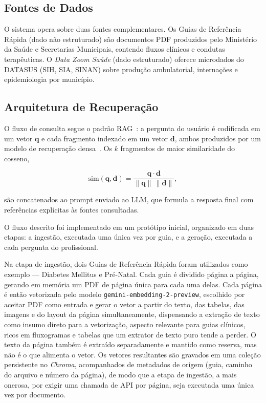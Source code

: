 \documentclass[conference,a4paper]{IEEEtran}
\begin{document}
\subsection{Fontes de Dados}

O sistema opera sobre duas fontes complementares. Os Guias
de Referência Rápida (dado não estruturado) são documentos PDF
produzidos pelo Ministério da Saúde e Secretarias Municipais,
contendo fluxos clínicos e condutas terapêuticas. O \textit{Data
Zoom Saúde} (dado estruturado) oferece microdados do DATASUS
(SIH, SIA, SINAN) sobre produção ambulatorial, internações e
epidemiologia por município.

\subsection{Arquitetura de Recuperação}

O fluxo de consulta segue o padrão RAG~\cite{lewis2020rag}: a
pergunta do usuário é codificada em um vetor $\mathbf{q}$ e cada
fragmento indexado em um vetor $\mathbf{d}$, ambos produzidos por
um modelo de recuperação densa~\cite{karpukhin2020dpr}. Os $k$
fragmentos de maior similaridade do cosseno,

\begin{equation}
  \text{sim}(\mathbf{q}, \mathbf{d}) =
    \frac{\mathbf{q} \cdot \mathbf{d}}{\|\mathbf{q}\|\,\|\mathbf{d}\|},
  \label{eq:cosine}
\end{equation}

são concatenados ao prompt enviado ao LLM, que formula a resposta
final com referências explícitas às fontes consultadas.

O fluxo descrito foi implementado em um protótipo inicial, organizado em duas etapas: a ingestão, executada uma única vez por guia, e a geração, executada a cada pergunta do profissional.

Na etapa de ingestão, dois Guias de Referência Rápida foram utilizados como exemplo --- Diabetes Mellitus e Pré-Natal. Cada guia é dividido página a página, gerando em memória um PDF de página única para cada uma delas. Cada página é então vetorizada pelo modelo \texttt{gemini-embedding-2-preview}, escolhido por aceitar PDF como entrada e gerar o vetor a partir do texto, das tabelas, das imagens e do layout da página simultaneamente, dispensando a extração de texto como insumo direto para a vetorização, aspecto relevante para guias clínicos, ricos em fluxogramas e tabelas que um extrator de texto puro tende a perder. O texto da página também é extraído separadamente e mantido como reserva, mas não é o que alimenta o vetor. Os vetores resultantes são gravados em uma coleção persistente no \textit{Chroma}, acompanhados de metadados de origem (guia, caminho do arquivo e número da página), de modo que a etapa de ingestão, a mais onerosa, por exigir uma chamada de API por página, seja executada uma única vez por documento.
\end{document}
